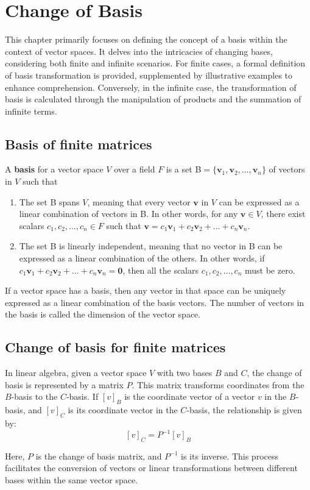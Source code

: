 \chapter{Change of Basis}
This chapter primarily focuses on defining the concept of a basis within the context of vector spaces. It delves into the intricacies of changing bases, considering both finite and infinite scenarios. For finite cases, a formal definition of basis transformation is provided, supplemented by illustrative examples to enhance comprehension. Conversely, in the infinite case, the transformation of basis is calculated through the manipulation of products and the summation of infinite terms.
\section{Basis of finite matrices}
\begin{definition}
A \textbf{basis} for a vector space $ V $ over a field $ F $ is a set $ $B$ = \{\mathbf{v}_1, \mathbf{v}_2, \ldots, \mathbf{v}_n\} $ of vectors in $ V $ such that
\end{definition}
\begin{enumerate}
    \item The set $ $B$ $ spans $ V $, meaning that every vector $ \mathbf{v} $ in $ V $ can be expressed as a linear combination of vectors in $ $B$ $. In other words, for any $ \mathbf{v} \in V $, there exist scalars $ c_1, c_2, \ldots, c_n \in F $ such that $ \mathbf{v} = c_1\mathbf{v}_1 + c_2\mathbf{v}_2 + \ldots + c_n\mathbf{v}_n $.
    \item The set $ $B$ $ is linearly independent, meaning that no vector in $ $B$ $ can be expressed as a linear combination of the others. In other words, if $ c_1\mathbf{v}_1 + c_2\mathbf{v}_2 + \ldots + c_n\mathbf{v}_n = \mathbf{0} $, then all the scalars $ c_1, c_2, \ldots, c_n $ must be zero.
\end{enumerate}
If a vector space has a basis, then any vector in that space can be uniquely expressed as a linear combination of the basis vectors. The number of vectors in the basis is called the dimension of the vector space.

\section{Change of basis for finite matrices}
\begin{definition}
    In linear algebra, given a vector space \(V\) with two bases $B$ and \(C\), the change of basis is represented by a matrix \(P\). This matrix transforms coordinates from the $B$-basis to the \(C\)-basis. If \([v]_B\) is the coordinate vector of a vector \(v\) in the $B$-basis, and \([v]_C\) is its coordinate vector in the \(C\)-basis, the relationship is given by:
    \[ [v]_C = P^{-1}[v]_B\]

Here, \(P\) is the change of basis matrix, and \(P^{-1}\) is its inverse. This process facilitates the conversion of vectors or linear transformations between different bases within the same vector space.
\end{definition}


